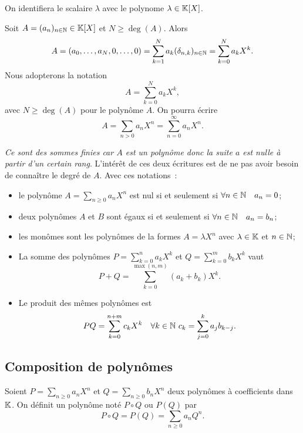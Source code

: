 On identifiera le scalaire $\lambda$ avec le polynome $\lambda \in \mathbb{K}[X]$.

Soit $A=(a_n)_{n \in \mathbb{N}} \in \mathbb{K}[X]$ et $N \geq \deg(A)$. Alors
\begin{equation}
  A = (a_0, \ldots, a_N, 0, \ldots, 0) = \sum_{k=1}^N a_k (\delta_{n,k})_{n \in \mathbb{N}}=\sum_{k=0}^N a_k X^k.
\end{equation}
Nous adopterons la notation
\begin{equation}
  A = \sum_{k=0}^N a_k X^k,
\end{equation}
avec $N \geq \deg(A)$ pour le polynôme $A$. On pourra écrire
\begin{equation}
  A = \sum_{n>0} a_n X^n = \sum_{n=0}^{\infty} a_n X^n.
\end{equation}

\emph{Ce sont des sommes finies car $A$ est un polynôme donc la suite $a$ est nulle à partir d'un certain rang}. L'intérêt de ces deux écritures est de ne pas avoir besoin de connaître le degré de $A$. Avec ces notations~:
\begin{itemize}
\item le polynôme $A=\sum_{n\geq 0} a_n X^n$ est nul si et seulement si $\forall n \in \mathbb{N} \quad a_n =0$;
\item deux polynômes $A$ et $B$ sont égaux si et seulement si $\forall n \in \mathbb{N} \quad a_n =b_n$;
\item les monômes sont les polynômes de la formes $A=\lambda X^n$ avec $\lambda \in \mathbb{K}$ et $n \in \mathbb{N}$;
\item La somme des polynômes $P=\sum_{k=0}^n a_k X^k$ et $Q=\sum_{k=0}^m b_k X^k$ vaut
  \begin{equation}
    P+Q = \sum_{k=0}^{\max(n,m)}(a_k+b_k) X^k.
  \end{equation}
\item Le produit des mêmes polynômes est
  \begin{equation}
    PQ = \sum_{k=0}^{n+m} c_k X^k \quad \forall k \in \mathbb{N} \ c_k=\sum_{j=0}^k a_j b_{k-j}.
  \end{equation}
\end{itemize}

\subsection{Composition de polynômes}

\begin{defdef}
  Soient $P=\sum_{n \geq 0} a_n X^n$ et $Q=\sum_{n \geq 0} b_n X^n$ deux polynômes à coefficients dans $\mathbb{K}$. On définit un polynôme noté $P \circ Q$ ou $P(Q)$ par
  \begin{equation}
    P \circ Q = P(Q) = \sum_{n \geq 0} a_n Q^n.
  \end{equation}
\end{defdef}

